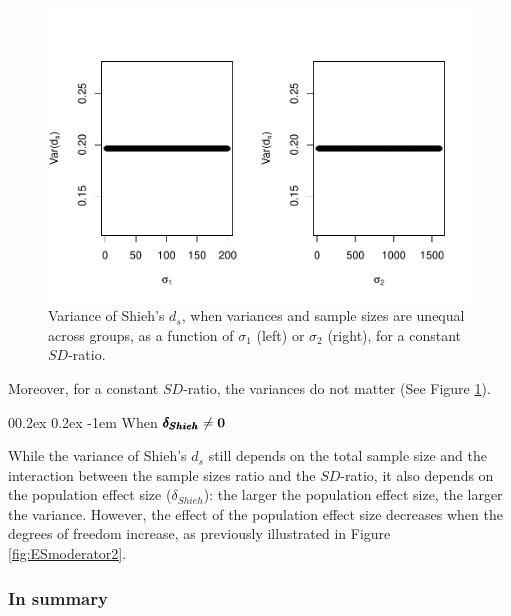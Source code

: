 \documentclass[
  english,
  man]{apa6}
\makeatletter
\let\oldparagraph\paragraph
\renewcommand{\paragraph}[1]{\oldparagraph{#1}\mbox{}}
\renewcommand{\paragraph}{\@startsection{paragraph}{4}{\parindent}%
  {0\baselineskip \@plus 0.2ex \@minus 0.2ex}%
  {-1em}%
  {\normalfont\normalsize\bfseries\itshape\typesectitle}}
\makeatother
\begin{document}
\begin{figure}
\centering
\includegraphics{Theoretical-Variance-of-all-estimators-as-a-function-of-population-parameters_files/figure-latex/varshiehhetunbalvariance2-1.pdf}
\caption{\label{fig:varshiehhetunbalvariance2}Variance of Shieh's \(d_s\), when variances and sample sizes are unequal across groups, as a function of \(\sigma_1\) (left) or \(\sigma_2\) (right), for a constant \(SD\)-ratio.}
\end{figure}

Moreover, for a constant \(SD\)-ratio, the variances do not matter (See Figure \ref{fig:varshiehhetunbalvariance2}).

\hypertarget{when-bf-pmbdelta_shieh-neq-0-2}{%
\paragraph{\texorpdfstring{When \(\bf \pmb{\delta_{Shieh}} \neq 0\)}{When \textbackslash bf \textbackslash pmb\{\textbackslash delta\_\{Shieh\}\} \textbackslash neq 0}}\label{when-bf-pmbdelta_shieh-neq-0-2}}

While the variance of Shieh's \(d_s\) still depends on the total sample size and the interaction between the sample sizes ratio and the \(SD\)-ratio, it also depends on the population effect size (\(\delta_{Shieh}\)): the larger the population effect size, the larger the variance. However, the effect of the population effect size decreases when the degrees of freedom increase, as previously illustrated in Figure \ref{fig:ESmoderator2}.

\hypertarget{in-summary-3}{%
\subsubsection{In summary}\label{in-summary-3}}
\end{document}
